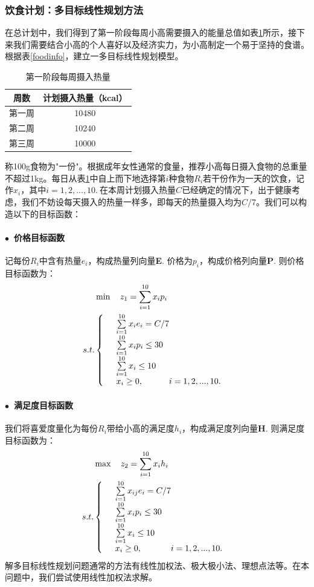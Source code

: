 \documentclass[a4paper,12pt,onecolumn,twoside]{article}
\begin{document}
\subsubsection{饮食计划：多目标线性规划方法}在总计划中，我们得到了第一阶段每周小高需要摄入的能量总值如表\ref{phase1calin}所示，接下来我们需要结合小高的个人喜好以及经济实力，为小高制定一个易于坚持的食谱。根据表\ref{foodinfo}，建立一多目标线性规划模型。%
\begin{table}[H]\label{phase1calin}
	\centering
	\caption{第一阶段每周摄入热量}
	\begin{tabular}{cc} 
		\toprule
		周数 & 计划摄入热量（kcal）\\\hline
		第一周 & 10480 \\
		第二周 & 10240 \\
		第三周 & 10000 \\\bottomrule
	\end{tabular}
\end{table}
称100g食物为"一份"。根据成年女性通常的食量，推荐小高每日摄入食物的总重量不超过1kg。每日从表\ref{phase1calin}中自上而下地选择第$i$种食物$R_{i}$若干份作为一天的饮食，记作$x_{i}$，其中$i=1,2,...,10.~$在本周计划摄入热量$C$已经确定的情况下，出于健康考虑，我们不妨设每天摄入的热量一样多，即每天的热量摄入均为$C/7$。我们可以构造以下的目标函数：
\paragraph{$\bullet$~价格目标函数~}记每份$R_{i}$中含有热量$e_{i}$，构成热量列向量\textbf{E}. 价格为$p_{i}$，构成价格列向量\textbf{P}. 则价格目标函数为：
\begin{align*}
	&\min \quad z_1= \sum_{i=1}^{10}  x_{i}p_{i} \\
	s.t.& \left\{ \begin{array}{r@{\quad}l@{}l@{\quad}l}
		& \sum\limits_{i=1}^{10} x_{i}e_{i}=C/7\\
		&\sum\limits_{i=1}^{10} x_{i}p_{i}\le 30\\
		&\sum\limits_{i=1}^{10} x_{i}\le 10\\
		& x_{i} \ge 0,  &i=1,2,...,10.
	\end{array}\right.
\end{align*}
\paragraph{$\bullet$~满足度目标函数~}我们将喜爱度量化为每份$R_{i}$带给小高的满足度$h_{i}$，构成满足度列向量\textbf{H}. 则满足度目标函数为：
\begin{align*}
	&\max \quad z_2= \sum_{i=1}^{10}  x_{i}h_{i} \\
	s.t.& \left\{ \begin{array}{r@{\quad}l@{}l@{\quad}l}
		& \sum\limits_{i=1}^{10} x_{ij}e_{i}=C/7\\
		&\sum\limits_{i=1}^{10} x_{i}p_{i}\le 30\\
		&\sum\limits_{i=1}^{10} x_{i}\le 10\\
		& x_{i} \ge 0,  &i=1,2,...,10.
	\end{array}\right.
\end{align*}
解多目标线性规划问题通常的方法有线性加权法、极大极小法、理想点法等。在本问题中，我们尝试使用线性加权法求解。
\end{document}
